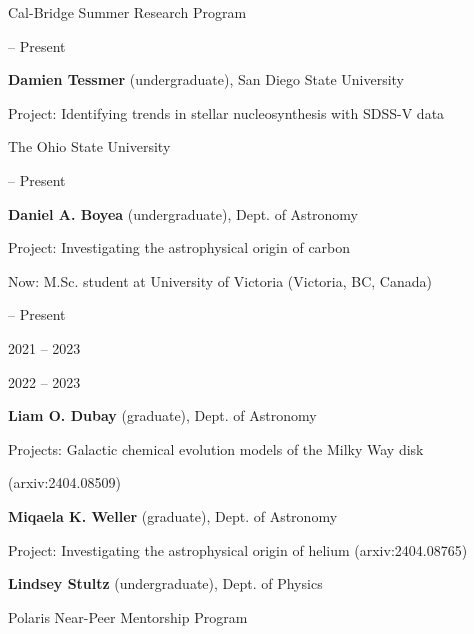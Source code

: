 \documentclass[cv.tex]{subfiles}
\begin{document}
{\color{themecolor} \large Cal-Bridge Summer Research Program}
\par\noindent
\parbox{0.18\textwidth}{%
	 -- Present \par
	\null \par
}
\hspace{1mm}
\parbox{0.8\textwidth}{%
	\vspace{1mm}
	\textbf{Damien Tessmer} (undergraduate), San Diego State University \par
	Project: Identifying trends in stellar nucleosynthesis with SDSS-V data \par
}

\vspace{5mm}
\noindent
{\color{themecolor} \large The Ohio State University}
\par\noindent
\parbox{0.18\textwidth}{%
	 -- Present \par
	\null \par
	\null \par
}
\hspace{1mm}
\parbox{0.8\textwidth}{%
	\vspace{1mm}
	\textbf{Daniel A. Boyea} (undergraduate), Dept. of Astronomy \par
	Project: Investigating the astrophysical origin of carbon \par
	Now: M.Sc. student at University of Victoria (Victoria, BC, Canada) \par
}

\newpage
\noindent
\parbox{0.18\textwidth}{%
	 -- Present \par
	\null \par
	\null \par
	2021 -- 2023 \par
	\null \par
	2022 -- 2023 \par
	\null
}
\hspace{1mm}
\parbox{0.8\textwidth}{%
	\vspace{1mm}
	\textbf{Liam O. Dubay} (graduate), Dept. of Astronomy \par
	Projects: Galactic chemical evolution models of the Milky Way disk \par
	(arxiv:2404.08509) \par
	\textbf{Miqaela K. Weller} (graduate), Dept. of Astronomy \par
	Project: Investigating the astrophysical origin of helium
	(arxiv:2404.08765) \par
	\textbf{Lindsey Stultz} (undergraduate), Dept. of Physics \par
	Polaris Near-Peer Mentorship Program
}
\end{document}
